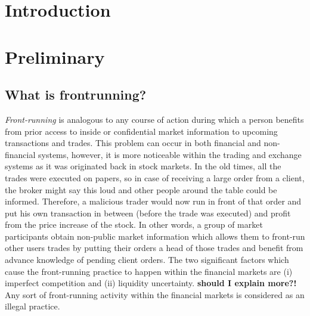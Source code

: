 
\section{Introduction}




\section{Preliminary}

\subsection{What is frontrunning?} %

\emph{Front-running} is analogous to any course of action during which a person benefits from prior access to inside or confidential market information to upcoming transactions and trades. This problem can occur in both financial and non-financial systems, however, it is more noticeable within the trading and exchange systems as it was originated back in stock markets. In the old times, all the trades were executed on papers, so in case of receiving a large order from a client, the broker might say this loud and other people around the table could be informed. Therefore, a malicious trader would now run in front of that order and put his own transaction in between (before the trade was executed) and profit from the price increase of the stock. In other words, a group of market participants obtain non-public market information which allows them to front-run other users trades by putting their orders a head of those trades and benefit from advance knowledge of pending client orders. The two significant factors which cause the front-running practice to happen within the financial markets are (i) imperfect competition and (ii) liquidity uncertainty. \textbf{should I explain more?!} Any sort of front-running activity within the financial markets is considered as an illegal practice.




